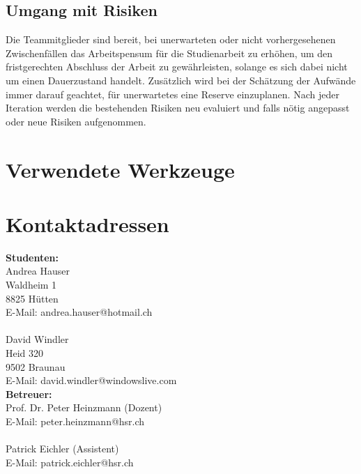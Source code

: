 \documentclass[12pt, a4paper]{report}
\begin{document}
	\section{Umgang mit Risiken}
	Die Teammitglieder sind bereit, bei unerwarteten oder nicht vorhergesehenen Zwischenfällen das Arbeitspensum für die Studienarbeit zu erhöhen, um den fristgerechten Abschluss der Arbeit zu gewährleisten, solange es sich dabei nicht um einen Dauerzustand handelt. Zusätzlich wird bei der Schätzung der Aufwände immer darauf geachtet, für unerwartetes eine Reserve einzuplanen.
	Nach jeder Iteration werden die bestehenden Risiken neu evaluiert und falls nötig angepasst oder neue Risiken aufgenommen.
	
	 

	\chapter{Verwendete Werkzeuge}
	\label{chap:werkzeuge}
	
	
	
	\chapter{Kontaktadressen}
	\label{LastPage}
	\begin{multicols}{2}
	\noindent \textbf{Studenten:}
	\\
	Andrea Hauser\\
	Waldheim 1\\
	8825 Hütten\\
	E-Mail: andrea.hauser@hotmail.ch\\
	\\
	David Windler\\
	Heid 320\\
	9502 Braunau\\
	\columnbreak
	E-Mail: david.windler@windowslive.com\\
	\textbf{Betreuer:}\\
	Prof. Dr. Peter Heinzmann (Dozent)\\
	E-Mail: peter.heinzmann@hsr.ch\\
	\\
	Patrick Eichler (Assistent)\\
	E-Mail: patrick.eichler@hsr.ch\\
	
	\end{multicols}
	
	

	
	
	
\end{document}
